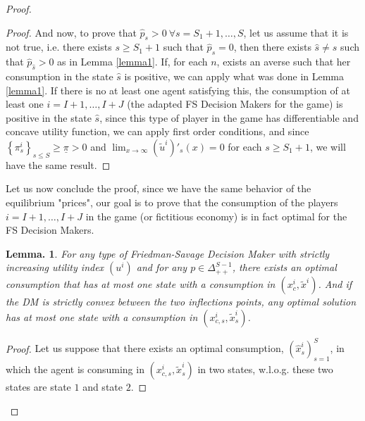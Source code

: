 \documentclass[pdftex]{article}
\numberwithin{equation}{section}
\theoremstyle{th}
\newtheorem{lemma}{{Lemma}.}%
\newtheorem{proof lemma}{{Proof Lemma}.}
\theoremstyle{definition}
\newtheorem*{risk lovers}{Risk lovers}
\newtheorem*{risk averse}{Risk averse}
\begin{document}
{\begin{proof}
\begin{proof}
And now, to prove that $\hat{p}_s>0\ \forall{s}=S_1+1,\dots,S$, let us assume that it is not true, i.e. there exists $s\geq{S_1+1}$ such that $\hat{p}_s=0$, then there exists $\hat{s}\neq s$ such that $\hat{p}_{\hat{s}}>0$ as in Lemma \ref{lemma1}. If, for each $n$, exists an averse such that her consumption in the state $\hat{s}$ is positive, we can apply what was done in Lemma \ref{lemma1}. If there is no at least one agent satisfying this, the consumption of at least one $i=I+1,\dots,I+J$ (the adapted FS Decision Makers for the game) is positive in the state $\hat{s}$, since this type of player in the game has differentiable and concave utility function, we can apply first order conditions, and since $\left\{\pi^i_s\right\}_{s\leq{S}}\geq\underline{\pi}>0$ and $\lim_{x\rightarrow\infty}\left(\tilde{u}^i\right)'_{s}(x)=0$ for each $s\geq{S}_1+1$, we will have the same result.
\end{proof}
Let us now conclude the proof, since we have the same behavior of the equilibrium "prices", our goal is to prove that the consumption of the players $i=I+1,\dots,I+J$ in the game (or fictitious economy) is in fact optimal for the FS Decision Makers.

\begin{lemma}
\label{lemma4}
For any type of Friedman-Savage Decision Maker with strictly increasing utility index $\left({u^i}\right)$ and for any $p\in\Delta_{++}^{S-1}$, there exists an optimal consumption that has at most one state with a consumption in $\left(x^i_c,\tilde{x}^i\right)$.{ And if the DM is strictly convex between the two inflections points, any optimal solution has at most one state with a consumption in $\left(x^i_{c,s},\tilde{x}^i_s\right)$.}
\end{lemma}
\begin{proof}%
{Let us suppose that there exists an optimal consumption, $\left(\hat{x}^i_s\right)_{s=1}^S$, in which the agent is consuming in $\left(x^i_{c,s},\tilde{x}^i_s\right)$ in two states, w.l.o.g. these two states are state $1$ and state $2$.}


\end{proof}
\end{proof}}
\end{document}
